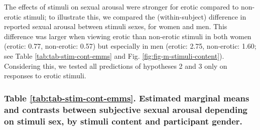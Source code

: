 \documentclass[
  bookmarksnumbered]{article}
\begin{document}
\begin{table}[H]
\centering
\caption{\label{tab:tab-m-stimuli-content}Effects of relationship type, gender and stimuli sex on Dyadic TSD Partner}
\centering
{}
\end{table}

The effects of stimuli on sexual arousal were stronger for erotic compared to non-erotic stimuli; to illustrate this, we compared the (within-subject) difference in reported sexual arousal between stimuli sexes, for women and men. This difference was larger when viewing erotic than non-erotic stimuli in both women (erotic: 0.77, non-erotic: 0.57) but especially in men (erotic: 2.75, non-erotic: 1.60; see Table \ref{tab:tab-stim-cont-emms} and Fig. \ref{fig:fig-m-stimuli-content}). Considering this, we tested all predictions of hypotheses 2 and 3 only on responses to erotic stimuli.

\subsubsection{Table \ref{tab:tab-stim-cont-emms}. Estimated marginal means and contrasts between subjective sexual arousal depending on stimuli sex, by stimuli content and participant gender.}\label{table-reftabtab-stim-cont-emms.-estimated-marginal-means-and-contrasts-between-subjective-sexual-arousal-depending-on-stimuli-sex-by-stimuli-content-and-participant-gender.}
\end{document}
